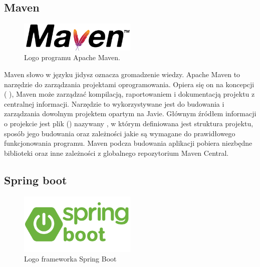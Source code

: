 \subsection{Maven}

\begin{figure}[htbp!]
    \centering
    \includegraphics[width=0.5\textwidth]{images/mavenLogo.png}
    \caption{Logo programu Apache Maven\cite{mavenSite}.}
    \label{fig:enter-label}
\end{figure}

Maven słowo w języku jidysz oznacza gromadzenie wiedzy. Apache Maven to narzędzie do zarządzania projektami oprogramowania. Opiera się on na koncepcji  ( ), Maven może zarządzać kompilacją, raportowaniem i dokumentacją projektu z centralnej informacji. Narzędzie to wykorzystywane jest do budowania i zarządzania dowolnym projektem opartym na Javie. Głównym źródłem informacji o projekcie jest plik  () nazywany , w którym definiowana jest struktura projektu, sposób jego budowania oraz zależności jakie są wymagane do prawidłowego funkcjonowania programu. Maven podcza budowania aplikacji pobiera niezbędne biblioteki oraz inne zależności z globalnego repozytorium Maven Central.

\subsection{Spring boot}

\begin{figure}[!htbp]
    \centering
    \includegraphics[width=0.5\textwidth]{images/springboot/springBootLogo.png}
    \caption{Logo frameworka Spring Boot \cite{springLogo}}
    \label{fig:enter-label}
\end{figure}


